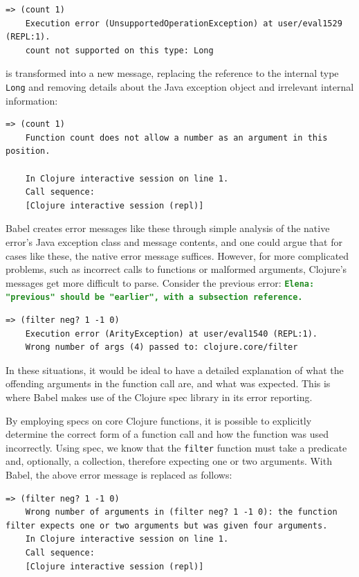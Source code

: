 \documentclass[12pt]{article}
\newcommand{\comment}[1]{{\bf \tt  {#1}}}
\newcommand{\emcomment}[1]{\textcolor{ForestGreen}{\comment{Elena: {#1}}}}
\begin{document}
\begin{lstlisting}[breaklines=true, basicstyle=\ttfamily]
    => (count 1)
    Execution error (UnsupportedOperationException) at user/eval1529 (REPL:1).
    count not supported on this type: Long
\end{lstlisting}
    
is transformed into a new message, replacing the reference to the internal type \verb|Long| and removing details about the Java exception object and irrelevant internal information:

\begin{lstlisting}[breaklines=true, basicstyle=\ttfamily]
    => (count 1)
    Function count does not allow a number as an argument in this position.

    In Clojure interactive session on line 1.
    Call sequence:
    [Clojure interactive session (repl)]
\end{lstlisting}

Babel creates error messages like these through simple analysis of the native error's Java exception class and message contents, and one could argue that for cases like these, the native error message suffices. However, for more complicated problems, such as incorrect calls to functions or malformed arguments, Clojure's messages get more difficult to parse. Consider the previous error: \emcomment{"previous" should be "earlier", with a subsection reference.} 

\begin{lstlisting}[breaklines=true, basicstyle=\ttfamily]
    => (filter neg? 1 -1 0)
    Execution error (ArityException) at user/eval1540 (REPL:1).
    Wrong number of args (4) passed to: clojure.core/filter
\end{lstlisting}

In these situations, it would be ideal to have a detailed explanation of what the offending arguments in the function call are, and what was expected. This is where Babel makes use of the Clojure spec library in its error reporting.

By employing specs on core Clojure functions, it is possible to explicitly determine the correct form of a function call and how the function was used incorrectly. Using spec, we know that the \verb|filter| function must take a predicate and, optionally, a collection, therefore expecting one or two arguments. With Babel, the above error message is replaced as follows:

\begin{lstlisting}[breaklines=true, basicstyle=\ttfamily]
    => (filter neg? 1 -1 0)
    Wrong number of arguments in (filter neg? 1 -1 0): the function filter expects one or two arguments but was given four arguments.
    In Clojure interactive session on line 1.
    Call sequence:
    [Clojure interactive session (repl)]
\end{lstlisting}
\end{document}
